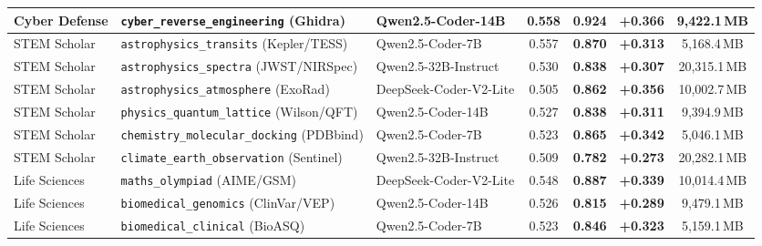 \documentclass[11pt,a4paper]{article}
\begin{document}
\begin{table}[htbp!]
{\begin{tabular}{@{}lllcccc@{}}
Cyber Defense & \texttt{cyber\_reverse\_engineering} (Ghidra) & Qwen2.5-Coder-14B & 0.558 & \textbf{0.924} & \textbf{+0.366} & 9{,}422.1\,MB \\
\midrule
STEM Scholar & \texttt{astrophysics\_transits} (Kepler/TESS) & Qwen2.5-Coder-7B & 0.557 & \textbf{0.870} & \textbf{+0.313} & 5{,}168.4\,MB \\
STEM Scholar & \texttt{astrophysics\_spectra} (JWST/NIRSpec) & Qwen2.5-32B-Instruct & 0.530 & \textbf{0.838} & \textbf{+0.307} & 20{,}315.1\,MB \\
STEM Scholar & \texttt{astrophysics\_atmosphere} (ExoRad) & DeepSeek-Coder-V2-Lite & 0.505 & \textbf{0.862} & \textbf{+0.356} & 10{,}002.7\,MB \\
STEM Scholar & \texttt{physics\_quantum\_lattice} (Wilson/QFT) & Qwen2.5-Coder-14B & 0.527 & \textbf{0.838} & \textbf{+0.311} & 9{,}394.9\,MB \\
STEM Scholar & \texttt{chemistry\_molecular\_docking} (PDBbind) & Qwen2.5-Coder-7B & 0.523 & \textbf{0.865} & \textbf{+0.342} & 5{,}046.1\,MB \\
STEM Scholar & \texttt{climate\_earth\_observation} (Sentinel) & Qwen2.5-32B-Instruct & 0.509 & \textbf{0.782} & \textbf{+0.273} & 20{,}282.1\,MB \\
\midrule
Life Sciences & \texttt{maths\_olympiad} (AIME/GSM) & DeepSeek-Coder-V2-Lite & 0.548 & \textbf{0.887} & \textbf{+0.339} & 10{,}014.4\,MB \\
Life Sciences & \texttt{biomedical\_genomics} (ClinVar/VEP) & Qwen2.5-Coder-14B & 0.526 & \textbf{0.815} & \textbf{+0.289} & 9{,}479.1\,MB \\
Life Sciences & \texttt{biomedical\_clinical} (BioASQ) & Qwen2.5-Coder-7B & 0.523 & \textbf{0.846} & \textbf{+0.323} & 5{,}159.1\,MB \\
\bottomrule
\end{tabular}%
}
\end{table}
\end{document}
